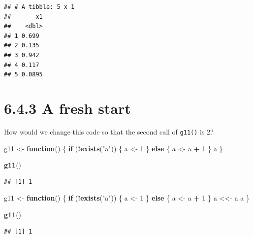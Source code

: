\documentclass[]{book}
\newenvironment{Shaded}{\begin{snugshade}}{\end{snugshade}}
\newcommand{\ControlFlowTok}[1]{\textcolor[rgb]{0.13,0.29,0.53}{\textbf{#1}}}
\newcommand{\DecValTok}[1]{\textcolor[rgb]{0.00,0.00,0.81}{#1}}
\newcommand{\KeywordTok}[1]{\textcolor[rgb]{0.13,0.29,0.53}{\textbf{#1}}}
\newcommand{\NormalTok}[1]{#1}
\newcommand{\OperatorTok}[1]{\textcolor[rgb]{0.81,0.36,0.00}{\textbf{#1}}}
\newcommand{\StringTok}[1]{\textcolor[rgb]{0.31,0.60,0.02}{#1}}
\begin{document}
\begin{verbatim}
## # A tibble: 5 x 1
##       x1
##    <dbl>
## 1 0.699 
## 2 0.135 
## 3 0.942 
## 4 0.117 
## 5 0.0895
\end{verbatim}

\hypertarget{a-fresh-start}{%
\section*{6.4.3 A fresh start}\label{a-fresh-start}}

How would we change this code so that the second call of \texttt{g11()} is 2?

\begin{Shaded}
\begin{Highlighting}[]
\NormalTok{g11 <-}\StringTok{ }\ControlFlowTok{function}\NormalTok{() \{}
  \ControlFlowTok{if}\NormalTok{ (}\OperatorTok{!}\KeywordTok{exists}\NormalTok{(}\StringTok{"a"}\NormalTok{)) \{}
\NormalTok{    a <-}\StringTok{ }\DecValTok{1}
\NormalTok{  \} }\ControlFlowTok{else}\NormalTok{ \{}
\NormalTok{    a <-}\StringTok{ }\NormalTok{a }\OperatorTok{+}\StringTok{ }\DecValTok{1}
\NormalTok{  \}}
\NormalTok{  a}
\NormalTok{\}}

\KeywordTok{g11}\NormalTok{()}
\end{Highlighting}
\end{Shaded}

\begin{verbatim}
## [1] 1
\end{verbatim}

\begin{Shaded}
\begin{Highlighting}[]
\NormalTok{g11 <-}\StringTok{ }\ControlFlowTok{function}\NormalTok{() \{}
  \ControlFlowTok{if}\NormalTok{ (}\OperatorTok{!}\KeywordTok{exists}\NormalTok{(}\StringTok{"a"}\NormalTok{)) \{}
\NormalTok{    a <-}\StringTok{ }\DecValTok{1}
\NormalTok{  \} }\ControlFlowTok{else}\NormalTok{ \{}
\NormalTok{    a <-}\StringTok{ }\NormalTok{a }\OperatorTok{+}\StringTok{ }\DecValTok{1}
\NormalTok{  \}}
\NormalTok{  a <<-}\StringTok{ }\NormalTok{a}
\NormalTok{  a}
\NormalTok{\}}

\KeywordTok{g11}\NormalTok{()}
\end{Highlighting}
\end{Shaded}

\begin{verbatim}
## [1] 1
\end{verbatim}
\end{document}
